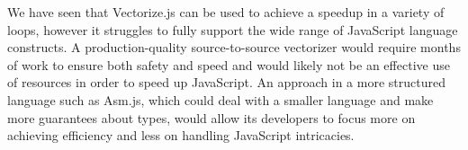 \documentclass[conference]{IEEEtran}
\begin{document}
We have seen that Vectorize.js can be used to achieve a speedup in a variety 
of loops, however it struggles to fully support the wide range of JavaScript
language constructs. A production-quality source-to-source vectorizer would 
require months of work to ensure both safety and speed and would likely not be
an effective use of resources in order to speed up JavaScript. An approach in 
a more structured language such as Asm.js, which could deal with a smaller language
and make more guarantees about types, would allow its developers to focus more on
achieving efficiency and less on handling JavaScript intricacies. 



%
%



%
%
\end{document}
